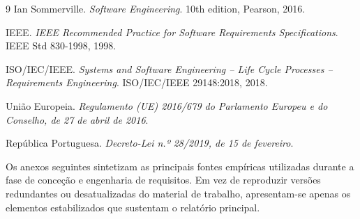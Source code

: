 \documentclass[a4paper,12pt]{scrreprt}
\begin{document}


\renewcommand\bibname{Referências}

\begin{thebibliography}{9}
Ian Sommerville.
\textit{Software Engineering}.
10th edition, Pearson, 2016.

IEEE.
\textit{IEEE Recommended Practice for Software Requirements Specifications}.
IEEE Std 830-1998, 1998.

ISO/IEC/IEEE.
\textit{Systems and Software Engineering -- Life Cycle Processes -- Requirements Engineering}.
ISO/IEC/IEEE 29148:2018, 2018.

União Europeia.
\textit{Regulamento (UE) 2016/679 do Parlamento Europeu e do Conselho, de 27 de abril de 2016}.

República Portuguesa.
\textit{Decreto-Lei n.º 28/2019, de 15 de fevereiro}.
\end{thebibliography}





    Os anexos seguintes sintetizam as principais fontes empíricas utilizadas durante a fase de conceção e engenharia de requisitos. Em vez de reproduzir versões redundantes ou desatualizadas do material de trabalho, apresentam-se apenas os elementos estabilizados que sustentam o relatório principal.
\end{document}
